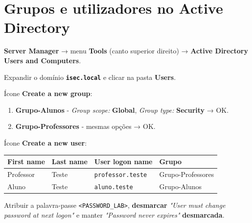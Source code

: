 
\section[Grupos e utilizadores no Active Directory]{Grupos e utilizadores no Active Directory}



\textbf{Server Manager} → menu \textbf{Tools} (canto superior direito) → \textbf{Active Directory Users and Computers}.


Expandir o domínio \textbf{\texttt{isec.local}} e clicar na pasta \textbf{Users}.


Ícone \textbf{Create a new group}:

\begin{enumerate}
\item \textbf{Grupo-Alunos} - \emph{Group scope:} \textbf{Global}, \emph{Group type:} \textbf{Security} → OK.
\item \textbf{Grupo-Professores} - mesmas opções → OK.
\end{enumerate}


Ícone \textbf{Create a new user}:

\begin{center}\small
\begin{tabularx}{\linewidth}{|>{\raggedright\arraybackslash}X|>{\raggedright\arraybackslash}X|>{\raggedright\arraybackslash}X|>{\raggedright\arraybackslash}X|}
\hline
\rowcolor{azul!10}\textbf{First name} & \textbf{Last name} & \textbf{User logon name} & \textbf{Grupo} \\
\hline
Professor & Teste & \texttt{professor.teste} & Grupo-Professores \\
\hline
Aluno & Teste & \texttt{aluno.teste} & Grupo-Alunos \\
\hline
\end{tabularx}
\end{center}


Atribuir a palavra-passe \texttt{\textless{}PASSWORD\_LAB\textgreater{}}, \textbf{desmarcar} \emph{"User must change password at next logon"} e manter \emph{"Password never expires"} \textbf{desmarcada}.

